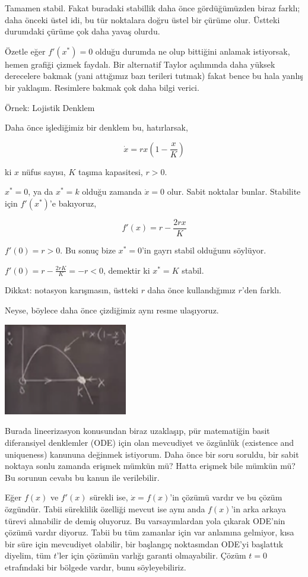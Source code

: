 \documentclass[12pt,fleqn]{article}\usepackage{../../common}
\begin{document}
Tamamen stabil. Fakat buradaki stabillik daha önce gördüğümüzden biraz farklı;
daha önceki üstel idi, bu tür noktalara doğru üstel bir çürüme olur. Üstteki
durumdaki çürüme çok daha yavaş olurdu.

Özetle eğer $f'(x^*)=0$ olduğu durumda ne olup bittiğini anlamak istiyorsak,
hemen grafiği çizmek faydalı. Bir alternatif Taylor açılımında daha yüksek
derecelere bakmak (yani attığımız bazı terileri tutmak) fakat bence bu hala
yanlış bir yaklaşım. Resimlere bakmak çok daha bilgi verici.

Örnek: Lojistik Denklem

Daha önce işlediğimiz bir denklem bu, hatırlarsak,

$$ \dot{x} = rx ( 1 - \frac{x}{K}) $$

ki $x$ nüfus sayısı, $K$ taşıma kapasitesi, $r > 0$.

$x^*=0$, ya da $x^*=k$ olduğu zamanda $\dot{x}=0$ olur. Sabit noktalar
bunlar. Stabilite için $f'(x^*)$'e bakıyoruz,

$$ f'(x) = r - \frac{2rx}{K} $$

$f'(0) = r > 0$. Bu sonuç bize $x^*=0$'in gayrı stabil olduğunu söylüyor. 

$f'(0) = r - \frac{2rK}{K} = -r < 0$, demektir ki $x^*=K$ stabil. 

Dikkat: notasyon karışmasın, üstteki $r$ daha önce kullandığımız $r$'den
farklı.

Neyse, böylece daha önce çizdiğimiz aynı resme ulaşıyoruz.

\includegraphics[height=4cm]{../chaos_01/1_09.png}

Burada lineerizasyon konusundan biraz uzaklaşıp, pür matematiğin basit
diferansiyel denklemler (ODE) için olan mevcudiyet ve özgünlük (existence and
uniqueness) kanununa değinmek istiyorum. Daha önce bir soru soruldu, bir sabit
noktaya sonlu zamanda erişmek mümkün mü? Hatta erişmek bile mümkün mü? Bu
sorunun cevabı bu kanun ile verilebilir.

Eğer $f(x)$ ve $f'(x)$ sürekli ise, $\dot{x} = f(x)$'in çözümü vardır ve bu
çözüm özgündür. Tabii süreklilik özelliği mevcut ise aynı anda $f(x)$'in arka
arkaya türevi alınabilir de demiş oluyoruz. Bu varsayımlardan yola çıkarak
ODE'nin çözümü vardır diyoruz. Tabii bu tüm zamanlar için var anlamına gelmiyor,
kısa bir süre için mevcudiyet olabilir, bir başlangıç noktasından ODE'yi
başlattık diyelim, tüm $t$'ler için çözümün varlığı garanti olmayabilir. Çözüm
$t=0$ etrafındaki bir bölgede vardır, bunu söyleyebiliriz. 
\end{document}
